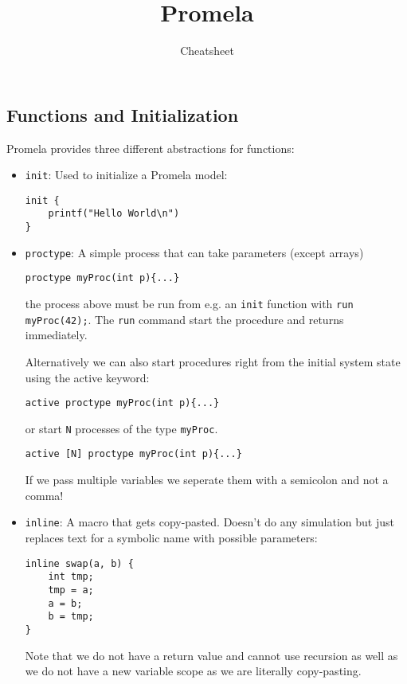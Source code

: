 \documentclass{sciposter}
\title{\huge{Promela}}
\author{\Large Cheatsheet}
\begin{document}
\maketitle

\begin{multicols}{3}

\section*{Functions and Initialization}
Promela provides three different abstractions for functions:

\begin{itemize}
	\item \texttt{init}: Used to initialize a Promela model:
	\begin{lstlisting}[language=promela]
init {
	printf("Hello World\n")
}
\end{lstlisting}


	\item \texttt{proctype}: A simple process that can take parameters (except arrays)
\begin{lstlisting}[language=promela]
proctype myProc(int p){...}
\end{lstlisting}
the process above must be run from e.g. an \texttt{init} function with \texttt{run myProc(42);}. The \texttt{run} command start the procedure and returns immediately.

Alternatively we can also start procedures right from the initial system state using the active keyword:
\begin{lstlisting}[language=promela]
active proctype myProc(int p){...}
\end{lstlisting}
or start \texttt{N} processes of the type \texttt{myProc}.
\begin{lstlisting}[language=promela]
active [N] proctype myProc(int p){...}
\end{lstlisting}
{\color{red}If we pass multiple variables we seperate them with a semicolon and not a comma!}
\item \texttt{inline}: A macro that gets copy-pasted. Doesn't do any simulation but just replaces text for a symbolic name with possible parameters:
\begin{lstlisting}[language=promela]
inline swap(a, b) {
	int tmp;
	tmp = a;
	a = b;
	b = tmp;
}
\end{lstlisting}
Note that we do not have a return value and cannot use recursion as well as we do not have a new variable scope as we are literally copy-pasting.
\end{itemize}


\end{multicols}
\end{document}
